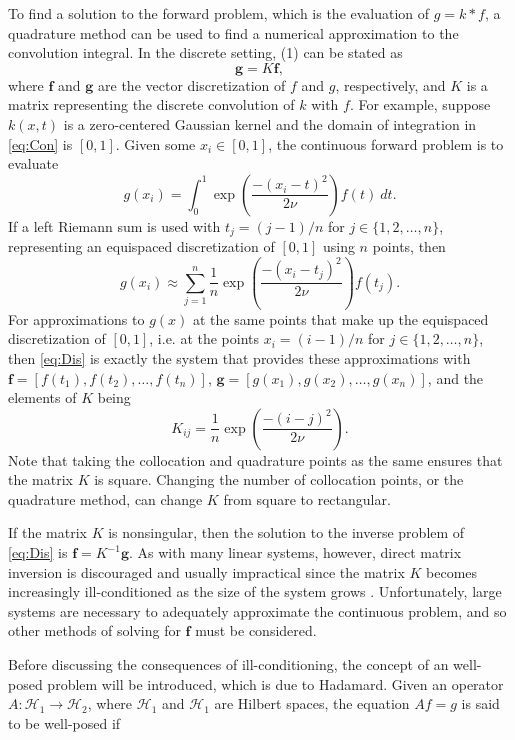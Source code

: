\documentclass[12pt]{article}
\newcommand{\gcon}{g}
\newcommand{\kcon}{k}
\newcommand{\fcon}{f}
\newcommand{\blurV}{\nu}	%
\newcommand{\gdis}{\mathbf{g}}
\newcommand{\kmat}{K}	%
\newcommand{\fdis}{\mathbf{f}}
\begin{document}
To find a solution to the forward problem, which is the evaluation of $\gcon = \kcon * \fcon$, a quadrature method can be used to find a numerical approximation to the convolution integral. In the discrete setting, (1) can be stated as
\begin{equation}
\gdis = \kmat\fdis,
\label{eq:Dis}
\end{equation}
where $\fdis$ and $\gdis$ are the vector discretization of $\fcon$ and $\gcon$, respectively, and $\kmat$ is a matrix representing the discrete convolution of $\kcon$ with $\fcon$. For example, suppose $\kcon(x,t)$ is a zero-centered Gaussian kernel and the domain of integration in \eqref{eq:Con} is $[0,1]$. Given some $x_i \in [0,1]$, the continuous forward problem is to evaluate
\[g(x_i) = \int_0^1 \exp\left(\frac{-(x_i - t)^2}{2\blurV}\right)\fcon(t) \: dt.\]
If a left Riemann sum is used with $t_j = (j-1)/n$ for $j \in \{1,2,\ldots,n\}$, representing an equispaced discretization of $[0,1]$ using $n$ points, then
\[g(x_i) \approx \sum_{j=1}^n \frac{1}{n}\exp\left(\frac{-(x_i - t_j)^2}{2\blurV}\right)\fcon(t_j).\]
For approximations to $\gcon(x)$ at the same points that make up the equispaced discretization of $[0,1]$, i.e. at the points $x_i = (i-1)/n$ for $j \in \{1,2,\ldots,n\}$, then \eqref{eq:Dis} is exactly the system that provides these approximations with $\fdis = [\fcon(t_1),\fcon(t_2),\ldots,\fcon(t_n)]$, $\gdis = [\gcon(x_1),\gcon(x_2),\ldots,\gcon(x_n)]$, and the elements of $\kmat$ being
\[K_{ij} = \frac{1}{n}\exp\left(\frac{-(i - j)^2}{2\blurV}\right).\]
Note that taking the collocation and quadrature points as the same ensures that the matrix $\kmat$ is square. Changing the number of collocation points, or the quadrature method, can change $\kmat$ from square to rectangular. \par
If the matrix $\kmat$ is nonsingular, then the solution to the inverse problem of \eqref{eq:Dis} is $\fdis = \kmat^{-1}\gdis$. As with many linear systems, however, direct matrix inversion is discouraged and usually impractical since the matrix $\kmat$ becomes increasingly ill-conditioned as the size of the system grows \cite{Vogel:2002}. Unfortunately, large systems are necessary to adequately approximate the continuous problem, and so other methods of solving for $\fdis$ must be considered. \par
Before discussing the consequences of ill-conditioning, the concept of an well-posed problem will be introduced, which is due to Hadamard. Given an operator $A : \mathcal{H}_1 \rightarrow \mathcal{H}_2$, where $\mathcal{H}_1$ and $\mathcal{H}_1$ are Hilbert spaces, the equation $Af = g$ is said to be well-posed if
\end{document}
